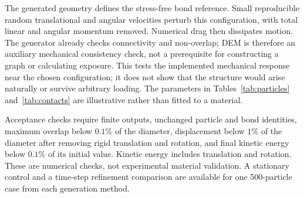 \documentclass[11pt,a4paper]{article}
\begin{document}
The generated geometry defines the stress-free bond reference. Small reproducible random translational and angular velocities perturb this configuration, with total linear and angular momentum removed. Numerical drag then dissipates motion. The generator already checks connectivity and non-overlap; DEM is therefore an auxiliary mechanical consistency check, not a prerequisite for constructing a graph or calculating exposure. This tests the implemented mechanical response near the chosen configuration; it does not show that the structure would arise naturally or survive arbitrary loading. The parameters in Tables~\ref{tab:particles} and~\ref{tab:contacts} are illustrative rather than fitted to a material.



Acceptance checks require finite outputs, unchanged particle and bond identities, maximum overlap below $0.1\%$ of the diameter, displacement below $1\%$ of the diameter after removing rigid translation and rotation, and final kinetic energy below $0.1\%$ of its initial value. Kinetic energy includes translation and rotation. These are numerical checks, not experimental material validation. A stationary control and a time-step refinement comparison are available for one 500-particle case from each generation method.


\FloatBarrier


\end{document}

